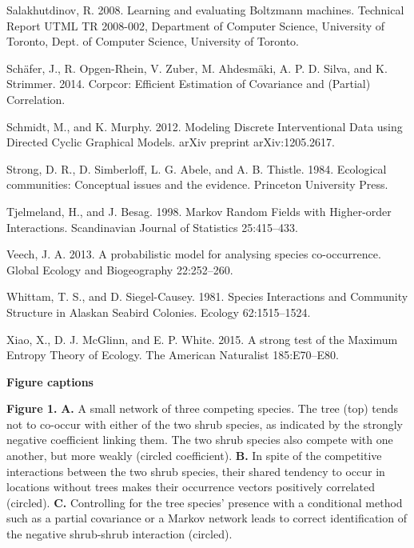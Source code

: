 \documentclass[12pt,]{article}
\begin{document}
\begin{spacing}{1.9}
\begin{flushleft}
Salakhutdinov, R. 2008. Learning and evaluating Boltzmann machines.
Technical Report UTML TR 2008-002, Department of Computer Science,
University of Toronto, Dept. of Computer Science, University of Toronto.

Schäfer, J., R. Opgen-Rhein, V. Zuber, M. Ahdesmäki, A. P. D. Silva, and
K. Strimmer. 2014. Corpcor: Efficient Estimation of Covariance and
(Partial) Correlation.

Schmidt, M., and K. Murphy. 2012. Modeling Discrete Interventional Data
using Directed Cyclic Graphical Models. arXiv preprint arXiv:1205.2617.

Strong, D. R., D. Simberloff, L. G. Abele, and A. B. Thistle. 1984.
Ecological communities: Conceptual issues and the evidence. Princeton
University Press.

Tjelmeland, H., and J. Besag. 1998. Markov Random Fields with
Higher-order Interactions. Scandinavian Journal of Statistics
25:415--433.

Veech, J. A. 2013. A probabilistic model for analysing species
co-occurrence. Global Ecology and Biogeography 22:252--260.

Whittam, T. S., and D. Siegel-Causey. 1981. Species Interactions and
Community Structure in Alaskan Seabird Colonies. Ecology 62:1515--1524.

Xiao, X., D. J. McGlinn, and E. P. White. 2015. A strong test of the
Maximum Entropy Theory of Ecology. The American Naturalist 185:E70--E80.

\textbf{Figure captions}


\setlength{\parskip}{3pt} \setlength{\parindent}{0em}
\setlength{\leftskip}{0em}

\textbf{Figure 1.} \textbf{A.} A small network of three competing
species. The tree (top) tends not to co-occur with either of the two
shrub species, as indicated by the strongly negative coefficient linking
them. The two shrub species also compete with one another, but more
weakly (circled coefficient). \textbf{B.} In spite of the competitive
interactions between the two shrub species, their shared tendency to
occur in locations without trees makes their occurrence vectors
positively correlated (circled). \textbf{C.} Controlling for the tree
species' presence with a conditional method such as a partial covariance
or a Markov network leads to correct identification of the negative
shrub-shrub interaction (circled).


\end{flushleft}
\end{spacing}
\end{document}
